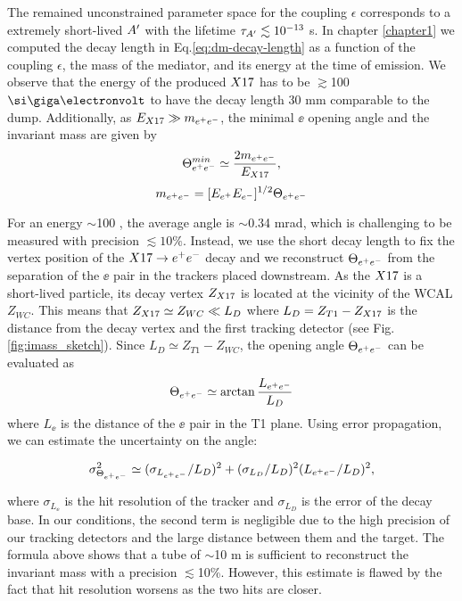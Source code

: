 The remained unconstrained parameter space for the coupling $\epsilon$  corresponds to a extremely short-lived $A'$ with the lifetime $\tau_{A'} \lesssim 10^{-13}$ s. In chapter \ref{chapter1} we computed the decay length in Eq.\ref{eq:dm-decay-length} as a function of the coupling $\epsilon$, the mass of the mediator, and its energy at the time of emission.
We observe that the energy of the produced $X17$ has to be $\gtrsim$100 $\gev$ to have the decay length 30 mm comparable to the dump.
Additionally, as $E_{X17} \gg m_{e^+e^-}$, the minimal $\ee$ opening angle and the invariant mass are given by
\begin{equation} 
\Theta_{ e^+e^-}^{min} \simeq  \frac{2m_{e^+e^-}}{E_{X17}},
\label{eqn:angle}
\end{equation}
\begin{equation}
m_{e^+e^-} = [E_{e^+} E_{e^-}]^{1/2} \Theta_{ e^+e^-}
\label{eqn:imass}
\end{equation}

For an energy $\sim$100 \gev, the average angle is $\sim$0.34 mrad, which is challenging to be measured with precision $\lesssim 10\%$. Instead, we use the short decay length to fix the vertex position of the $X17 \rightarrow e^+ e^-$ decay and we reconstruct $\Theta_{ e^+e^-}$ from the separation of the $\ee$ pair in the trackers placed downstream. As the $X17$ is a short-lived particle, its decay vertex $Z_{X17}$ is located at the vicinity of the WCAL $Z_{WC}$. This means that $Z_{X17} \simeq Z_{WC} \ll L_D$ where $L_D=Z_{T1}-Z_{X17}$ is the distance from the decay vertex and the first tracking detector (see Fig.\ref{fig:imass_sketch}). Since $L_D \simeq Z_{T1} - Z_{WC}$, the opening angle $\Theta_{ e^+e^-}$ can be evaluated as 
\begin{equation}
\Theta_{ e^+e^-} \simeq \arctan{\frac{ L_{e^+e^-}}{L_D}}
\label{angle-est}
\end{equation}
where $L_{\ee}$ is the distance of the $\ee$ pair in the T1 plane. Using error propagation, we can estimate the uncertainty on the angle:

\begin{equation}
  \sigma^2_{\Theta_{ e^+e^-}} \simeq (\sigma_{L_{e^+e^-}}  / L_D)^2 + (\sigma_{L_D} / L_D)^2(L_{e^+e^-} / L_D)^2,
  \label{eqn:thetaerr}
\end{equation}

where $\sigma_{L_{\ee}}$ is the hit resolution of the tracker and $\sigma_{L_D}$ is the error of the decay base. In our conditions, the second term is negligible due to the high precision of our tracking detectors and the large distance between them and the target. The formula above shows that a tube of $\sim$10 m is sufficient to reconstruct the invariant mass with a precision $\lesssim$10\%. However, this estimate is flawed by the fact that hit resolution worsens as the two hits are closer.

